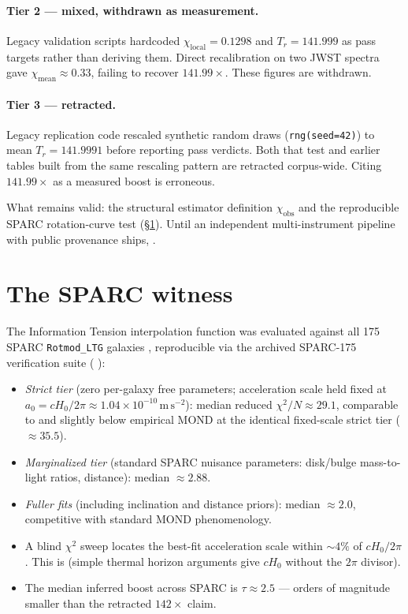 \documentclass{alienfolio}
\begin{document}
\paragraph{Tier 2 --- mixed, withdrawn as measurement.} Legacy validation
scripts hardcoded $\chi_{\mathrm{local}} = 0.1298$ and
$T_{r} = 141.999$ as pass targets rather than deriving them. Direct
recalibration on two JWST spectra gave $\chi_{\mathrm{mean}} \approx
0.33$, failing to recover $141.99\times$. These figures are withdrawn.

\paragraph{Tier 3 --- retracted.} Legacy replication code rescaled
synthetic random draws (\texttt{rng(seed=42)}) to mean $T_{r} = 141.9991$
before reporting pass verdicts. Both that test and earlier tables built
from the same rescaling pattern are retracted corpus-wide. Citing
$141.99\times$ as a measured boost is erroneous.

What remains valid: the structural estimator definition
$\chi_{\mathrm{obs}}$ and the reproducible SPARC rotation-curve test
(\S\ref{sec:sparc}). Until an independent multi-instrument pipeline with
public provenance ships, .

\section{The SPARC witness}
\label{sec:sparc}

The Information Tension interpolation function was evaluated against all
175 SPARC \texttt{Rotmod\_LTG} galaxies \cite{lelli16}, reproducible via
the archived SPARC-175 verification suite (
\cite{arsmagna}):

\begin{itemize}
\item \emph{Strict tier} (zero per-galaxy free parameters; acceleration
scale held fixed at $a_{0} = cH_{0}/2\pi \approx
1.04 \times 10^{-10}\,\mathrm{m\,s^{-2}}$): median reduced
$\chi^{2}/N \approx 29.1$, comparable to and slightly below empirical
MOND at the identical fixed-scale strict tier ($\approx 35.5$).
\item \emph{Marginalized tier} (standard SPARC nuisance parameters:
disk/bulge mass-to-light ratios, distance): median $\approx 2.88$.
\item \emph{Fuller fits} (including inclination and distance priors):
median $\approx 2.0$, competitive with standard MOND phenomenology.
\item A blind $\chi^{2}$ sweep locates the best-fit acceleration scale
within $\sim 4\%$ of $cH_{0}/2\pi$. This is  (simple thermal horizon
arguments give $cH_{0}$ without the $2\pi$ divisor).
\item The median inferred boost across SPARC is $\tau \approx 2.5$ ---
orders of magnitude smaller than the retracted $142\times$ claim.
\end{itemize}
\end{document}
